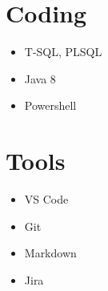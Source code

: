 \documentclass[letterpaper,11pt]{article}
\begin{document}
\begin{minipage}[t]{0.15\linewidth}
	\section{Coding}
	\begin{itemize}[leftmargin=*]
		\item T-SQL, PLSQL		
		\item Java 8		
		\item Powershell		
	\end{itemize}
	\section{Tools}
	\begin{itemize}[leftmargin=*]
		\item VS Code
		\item Git		
		\item Markdown
		\item Jira
	\end{itemize}
\end{minipage}



%
%


\end{document}
